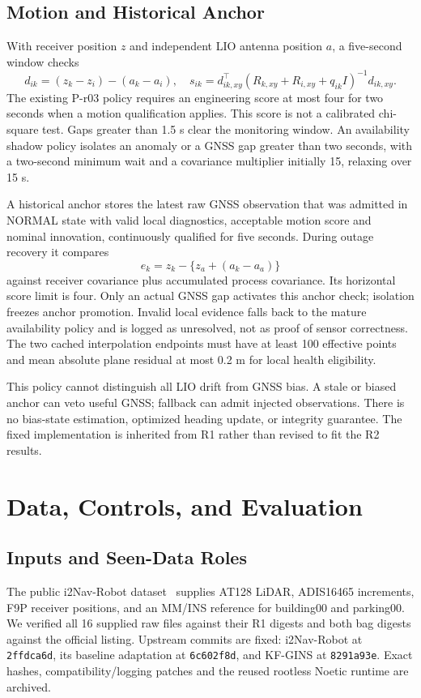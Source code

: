 \documentclass[conference]{IEEEtran}
\begin{document}
\subsection{Motion and Historical Anchor}
With receiver position $z$ and independent LIO antenna position $a$, a five-second window checks
\begin{equation}
 d_{ik}=(z_k-z_i)-(a_k-a_i),\quad
 s_{ik}=d_{ik,xy}^{\top}(R_{k,xy}+R_{i,xy}+q_{ik}I)^{-1}d_{ik,xy}.
\end{equation}
The existing P-r03 policy requires an engineering score at most four for two seconds when a motion qualification applies. This score is not a calibrated chi-square test. Gaps greater than 1.5 s clear the monitoring window. An availability shadow policy isolates an anomaly or a GNSS gap greater than two seconds, with a two-second minimum wait and a covariance multiplier initially 15, relaxing over 15 s.

A historical anchor stores the latest raw GNSS observation that was admitted in NORMAL state with valid local diagnostics, acceptable motion score and nominal innovation, continuously qualified for five seconds. During outage recovery it compares
\begin{equation}
 e_k=z_k-\{z_a+(a_k-a_a)\}
\end{equation}
against receiver covariance plus accumulated process covariance. Its horizontal score limit is four. Only an actual GNSS gap activates this anchor check; isolation freezes anchor promotion. Invalid local evidence falls back to the mature availability policy and is logged as unresolved, not as proof of sensor correctness. The two cached interpolation endpoints must have at least 100 effective points and mean absolute plane residual at most 0.2 m for local health eligibility.

This policy cannot distinguish all LIO drift from GNSS bias. A stale or biased anchor can veto useful GNSS; fallback can admit injected observations. There is no bias-state estimation, optimized heading update, or integrity guarantee. The fixed implementation is inherited from R1 rather than revised to fit the R2 results.

\section{Data, Controls, and Evaluation}
\subsection{Inputs and Seen-Data Roles}
The public i2Nav-Robot dataset~\cite{i2nav} supplies AT128 LiDAR, ADIS16465 increments, F9P receiver positions, and an MM/INS reference for building00 and parking00. We verified all 16 supplied raw files against their R1 digests and both bag digests against the official listing. Upstream commits are fixed: i2Nav-Robot at \texttt{2ffdca6d}, its baseline adaptation at \texttt{6c602f8d}, and KF-GINS at \texttt{8291a93e}. Exact hashes, compatibility/logging patches and the reused rootless Noetic runtime are archived.
\end{document}

